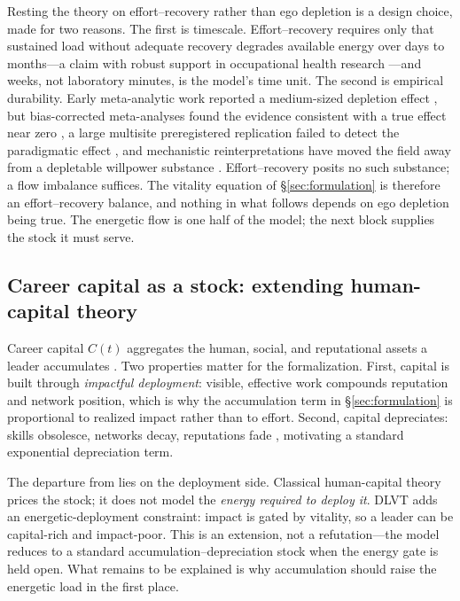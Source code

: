 Resting the theory on effort--recovery rather than ego depletion
\citep{baumeister1998ego} is a design choice, made for two reasons. The
first is timescale. Effort--recovery requires only that sustained load
without adequate recovery degrades available energy over days to
months---a claim with robust support in occupational health research
\citep{demerouti2001job,bakker2017jdr,alarcon2011meta}---and weeks, not
laboratory minutes, is the model's time unit. The second is empirical
durability. Early meta-analytic work reported a medium-sized depletion
effect \citep{hagger2010ego}, but bias-corrected meta-analyses found the
evidence consistent with a true effect near zero \citep{carter2015series},
a large multisite preregistered replication failed to detect the
paradigmatic effect \citep{vohs2021multisite}, and mechanistic
reinterpretations have moved the field away from a depletable willpower
substance \citep{inzlicht2016running}. Effort--recovery posits no such
substance; a flow imbalance suffices. The vitality equation of
\S\ref{sec:formulation} is therefore an effort--recovery balance, and
nothing in what follows depends on ego depletion being true. The energetic
flow is one half of the model; the next block supplies the stock it must
serve.

\subsection{Career capital as a stock: extending human-capital theory}
\label{sec:foundations-capital}

Career capital $C(t)$ aggregates the human, social, and reputational assets
a leader accumulates \citep{becker1993human,day2015leadership}. Two
properties matter for the formalization. First, capital is built through
\emph{impactful deployment}: visible, effective work compounds reputation
and network position, which is why the accumulation term in
\S\ref{sec:formulation} is proportional to realized impact rather than to
effort. Second, capital depreciates: skills obsolesce, networks decay,
reputations fade \citep{march1991exploration}, motivating a standard
exponential depreciation term.

The departure from \citet{becker1993human} lies on the deployment side.
Classical human-capital theory prices the stock; it does not model the
\emph{energy required to deploy it}. DLVT adds an energetic-deployment
constraint: impact is gated by vitality, so a leader can be capital-rich
and impact-poor. This is an extension, not a refutation---the model reduces
to a standard accumulation--depreciation stock when the energy gate is held
open. What remains to be explained is why accumulation should raise the
energetic load in the first place.

